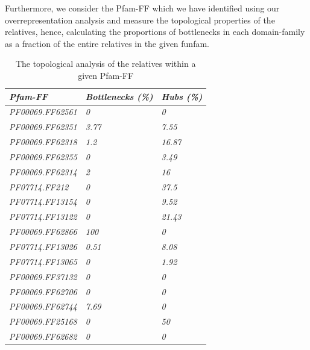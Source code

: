 \documentclass[a4paper, 11pt]{article}
\begin{document}
Furthermore, we consider the Pfam-FF which we have identified using our overrepresentation analysis and measure the topological properties of the relatives, hence, calculating the proportions of bottlenecks in each domain-family as a fraction of the entire relatives in the given funfam.

\begin{table}[H]
\fontsize{8}{8}\selectfont
\centering
\caption{The topological analysis of the relatives within a given Pfam-FF}
\label{Pfam-topology}
\begin{tabular}{|l|l|l|}
\hline
\textit{Pfam-FF}         & \textit{Bottlenecks (\%)} & \textit{Hubs (\%)} \\ \hline
\textit{PF00069.FF62561} & \textit{0}                & \textit{0}         \\ \hline
\textit{PF00069.FF62351} & \textit{3.77}             & \textit{7.55}      \\ \hline
\textit{PF00069.FF62318} & \textit{1.2}              & \textit{16.87}     \\ \hline
\textit{PF00069.FF62355} & \textit{0}                & \textit{3.49}      \\ \hline
\textit{PF00069.FF62314} & \textit{2}                & \textit{16}        \\ \hline
\textit{PF07714.FF212}   & \textit{0}                & \textit{37.5}      \\ \hline
\textit{PF07714.FF13154} & \textit{0}                & \textit{9.52}      \\ \hline
\textit{PF07714.FF13122} & \textit{0}                & \textit{21.43}     \\ \hline
\textit{PF00069.FF62866} & \textit{100}              & \textit{0}         \\ \hline
\textit{PF07714.FF13026} & \textit{0.51}             & \textit{8.08}      \\ \hline
\textit{PF07714.FF13065} & \textit{0}                & \textit{1.92}      \\ \hline
\textit{PF00069.FF37132} & \textit{0}                & \textit{0}         \\ \hline
\textit{PF00069.FF62706} & \textit{0}                & \textit{0}         \\ \hline
\textit{PF00069.FF62744} & \textit{7.69}             & \textit{0}         \\ \hline
\textit{PF00069.FF25168} & \textit{0}                & \textit{50}        \\ \hline
\textit{PF00069.FF62682} & \textit{0}                & \textit{0}         \\ \hline

\end{tabular}
\end{table}
\end{document}
